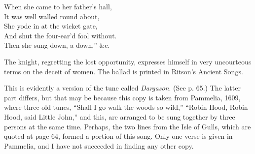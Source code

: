 \settowidth{\versewidth}{“When she came to her father’s hall,}
\begin{scverse}
\begin{patverse}
When she came to her father’s hall,\\
It was well walled round about,\\
She yode in at the wicket gate,\\
And shut the four-ear’d fool without.\\
Then she sung down, a-down,” \&c.
\end{patverse}
\end{scverse}
The knight, regretting the lost opportunity, expresses himself in very uncourteous
terms on the deceit of women. The ballad is printed in Ritson’s Ancient Songs.

\noindent\begin{minipage}{\textwidth}
\bigskip

\end{minipage}


This is evidently a version of the tune called \textit{Dargason}. (See p. 65.) The latter
part differs, but that may be because this copy is taken from Pammelia, 1609,
where three old tunes, “Shall I go walk the woods so wild,” “Robin Hood, Robin
Hood, said Little John,” and this, are arranged to be sung together by three
persons at the same time. Perhaps, the two lines from the Isle of Gulls, which
are quoted at page 64, formed a portion of this song. Only one verse is given in
Pammelia, and I have not succeeded in finding any other copy.


\pagebreak